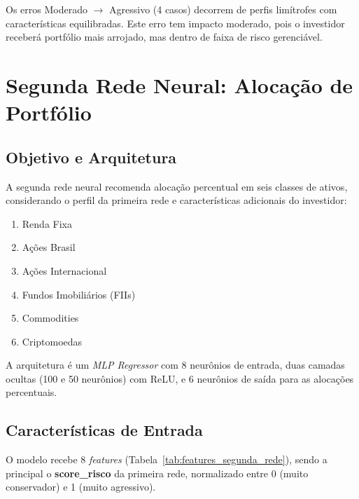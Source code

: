 Os erros Moderado $\rightarrow$ Agressivo (4 casos) decorrem de perfis limítrofes com características equilibradas. Este erro tem impacto moderado, pois o investidor receberá portfólio mais arrojado, mas dentro de faixa de risco gerenciável.

\section{Segunda Rede Neural: Alocação de Portfólio}

\subsection{Objetivo e Arquitetura}

A segunda rede neural recomenda alocação percentual em seis classes de ativos, considerando o perfil da primeira rede e características adicionais do investidor:
\begin{enumerate}
    \item Renda Fixa
    \item Ações Brasil
    \item Ações Internacional
    \item Fundos Imobiliários (FIIs)
    \item Commodities
    \item Criptomoedas
\end{enumerate}

A arquitetura é um \textit{MLP Regressor} com 8 neurônios de entrada, duas camadas ocultas (100 e 50 neurônios) com ReLU, e 6 neurônios de saída para as alocações percentuais.

\subsection{Características de Entrada}

O modelo recebe 8 \textit{features} (Tabela~\ref{tab:features_segunda_rede}), sendo a principal o \textbf{score\_risco} da primeira rede, normalizado entre 0 (muito conservador) e 1 (muito agressivo).

